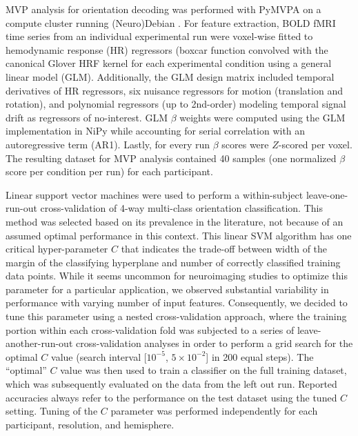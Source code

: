 \noindent MVP analysis for orientation decoding  was performed with PyMVPA
\citep[v2.3.1; ][]{Hanke_2009} on a compute cluster running  (Neuro)Debian
\citep[v8.0; ][]{HH12}. For feature extraction, BOLD fMRI time series from an
individual experimental run were voxel-wise fitted to hemodynamic response (HR)
regressors (boxcar function convolved with the canonical Glover HRF kernel
\citep{glover_1999} for each experimental condition using a general linear
model (GLM). Additionally, the GLM design matrix included temporal derivatives
of HR regressors, six nuisance regressors for motion (translation
and rotation), and polynomial regressors (up to 2nd-order) modeling temporal
signal drift as regressors of no-interest. GLM $\beta$ weights were computed
using the GLM implementation in NiPy \citep[v0.3; ][]{millman_2007} while
accounting for serial correlation with an autoregressive term (AR1). Lastly,
for every run $\beta$ scores were $Z$-scored per voxel. The resulting
dataset for MVP analysis contained 40 samples (one normalized $\beta$ score per
condition per run) for each participant.

Linear support vector machines \citep[SVM; PyMVPA's \texttt{LinearCSVMC}
implementation of the LIBSVM classification algorithm; ][]{chang_2011} were
used to perform a within-subject leave-one-run-out cross-validation of 4-way
multi-class orientation classification. This method was selected based on its
prevalence in the literature, not because of an assumed optimal performance in
this context. This linear SVM algorithm has one critical hyper-parameter $C$
that indicates the trade-off between width of the margin of the classifying
hyperplane and number of correctly classified training data points. While it
seems uncommon for neuroimaging studies to optimize this parameter for a
particular application, we observed substantial variability in performance with
varying number of input features. Consequently, we decided to tune this
parameter using a nested cross-validation approach, where the training portion
within each cross-validation fold was subjected to a series of
leave-another-run-out cross-validation analyses in order to perform a grid
search for the optimal $C$ value (search interval [$10^{-5}$, $5\times10^{-2}$] in 200 equal steps). 
The ``optimal'' $C$ value was then used to train a classifier on the
full training dataset, which was subsequently evaluated on the data from the
left out run. Reported accuracies always refer to the performance on the test
dataset using the tuned $C$ setting. Tuning of the $C$ parameter was performed
independently for each participant, resolution, and hemisphere.


